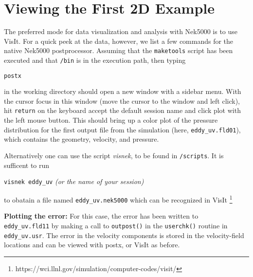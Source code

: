 
\section{Viewing the First 2D Example}

The preferred mode for data visualization and analysis with Nek5000 is
to use VisIt.  For a quick
peek at the data, however, we list a few commands for the native Nek5000 
postprocessor.   Assuming that the {\tt maketools} script has been executed
and that {\tt /bin} is in the execution path, then typing 

\noindent
{\tt postx} 

\noindent
in the working directory should open a new window with a sidebar menu.
With the cursor focus in this window (move the cursor to the window and
left click), hit {\tt return} on the keyboard accept the default session name and click {\sc plot} with the left mouse button.  This should bring up
a color plot of the pressure distribution for the first output file
from the simulation (here, {\tt eddy\_uv.fld01}), which contains the
geometry, velocity, and pressure.  

Alternatively one can use the script \textit{visnek}, to be found in {\tt /scripts}. It is sufficent to run 

\noindent
{\tt visnek eddy\_uv}\textit{ (or the name of your session)}

to obatain a file named {\tt eddy\_uv.nek5000} which can be recognized in VisIt \footnote{https://wci.llnl.gov/simulation/computer-codes/visit/}


\begin{comment}
To see the vorticity at the final time, load the last output file,
{\tt eddy\_uv.fld12}, by clicking/typing the following in the postx window:
\begin{tabular}{r l l l}
  & {\bf click} \hspace*{1in} &{\bf type} \hspace*{1in} & {\bf comment} \\ \hline
1.& SET TIME         & 12 & load fld12 \\
2.& SET QUANTITY \\
3.& VORTICITY \\
4.& PLOT 
\end{tabular}
\end{comment}

{\bf Plotting the error:}
For this case, the error has been written to {\tt
eddy\_uv.fld11} by making a call to {\tt outpost()} in the {\tt userchk()}
routine in {\tt eddy\_uv.usr}.  The error in the velocity components
is stored in the velocity-field locations and can be viewed with 
postx, or VisIt as before.

